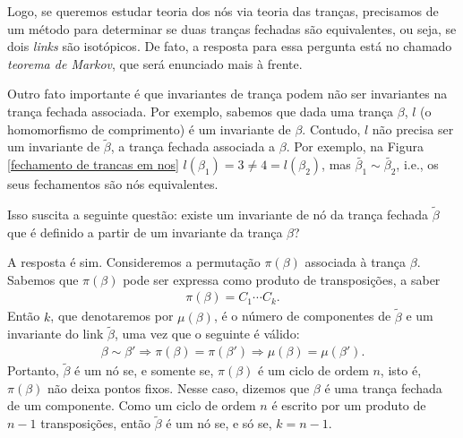 	\par\vspace{0.3cm} Logo, se queremos estudar teoria dos nós via teoria das tranças, 
	precisamos de um método para determinar se duas tranças fechadas são equivalentes, 
	ou seja, se dois \textit{links} são isotópicos. De fato, a resposta para essa pergunta 
	está no chamado \textit{teorema de Markov}, que será enunciado mais à frente.
	
	\par\vspace{0.3cm} Outro fato importante é que invariantes de trança podem não ser invariantes 
	na trança fechada associada. Por exemplo, sabemos que dada uma trança $\beta$, $l$ 
	(o homomorfismo de comprimento) é um invariante de $\beta$. Contudo, $l$ não precisa 
	ser um invariante de $\widetilde{\beta}$, a trança fechada associada a $\beta$. 
	Por exemplo, na Figura \ref{fechamento de trancas em nos} $l(\beta_1) = 3 \neq 4 = l(\beta_2)$, mas
	$\widetilde{\beta_1}\sim\widetilde{\beta_2}$, i.e., os seus fechamentos são nós equivalentes.
	
	\par\vspace{0.3cm} Isso suscita a seguinte questão: existe um invariante de nó 
	da trança fechada $\widetilde{\beta}$ que é definido a partir de um invariante da trança $\beta$?
	
	\par\vspace{0.3cm} A resposta é sim. Consideremos a permutação $\pi(\beta)$ associada 
	à trança $\beta$. Sabemos que $\pi(\beta)$ pode ser expressa como produto de transposições, a saber
	\begin{align*}
	    \pi(\beta) = C_1\cdots C_k.
	\end{align*}
	Então $k$, que denotaremos por $\mu(\beta)$, é o número de componentes de $\widetilde{\beta}$ 
	e um invariante do link $\widetilde{\beta}$, uma vez que o seguinte é válido:
	\begin{align*}
	    \beta\sim\beta' \Rightarrow \pi(\beta) = \pi(\beta') \Rightarrow \mu(\beta) = \mu(\beta').
	\end{align*}
	Portanto, $\widetilde{\beta}$ é um nó se, e somente se, $\pi(\beta)$ é um ciclo de ordem $n$, 
	isto é, $\pi(\beta)$ não deixa pontos fixos. Nesse caso, dizemos que $\beta$ é uma 
	trança fechada de um componente. Como um ciclo de ordem $n$ é escrito por um produto 
	de $n-1$ transposições, então $\widetilde{\beta}$ é um nó se, e só se, $k = n-1$.
	
